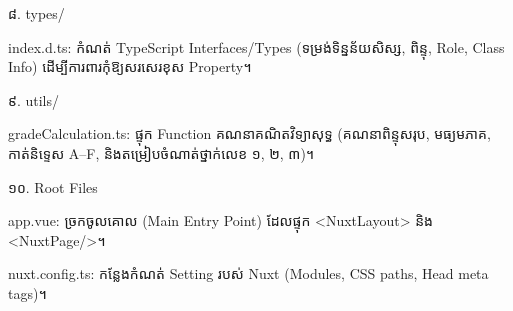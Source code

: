 ៨. types/

index.d.ts: កំណត់ TypeScript Interfaces/Types (ទម្រង់ទិន្នន័យសិស្ស, ពិន្ទុ, Role, Class Info) ដើម្បីការពារកុំឱ្យសរសេរខុស Property។

៩. utils/

gradeCalculation.ts: ផ្ទុក Function គណនាគណិតវិទ្យាសុទ្ធ (គណនាពិន្ទុសរុប, មធ្យមភាគ, កាត់និទ្ទេស A–F, និងតម្រៀបចំណាត់ថ្នាក់លេខ ១, ២, ៣)។

១០. Root Files

app.vue: ច្រកចូលគោល (Main Entry Point) ដែលផ្ទុក <NuxtLayout> និង <NuxtPage/>។

nuxt.config.ts: កន្លែងកំណត់ Setting របស់ Nuxt (Modules, CSS paths, Head meta tags)។
